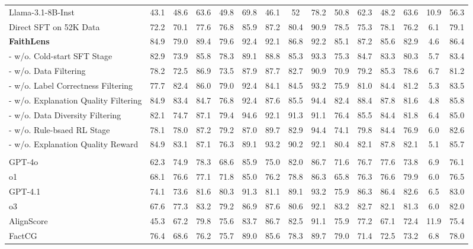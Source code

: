 \begin{table}[!t]
{\begin{tabular}{lcccccccccccccc}
Llama-3.1-8B-Inst & 43.1 & 48.6 & 63.6 & 49.8 & 69.8 & 46.1 & 52 & 78.2 & 50.8 & 62.3 & 48.2 & 63.6 & 10.9 & 56.3 \\
Direct SFT on 52K Data  & 72.2 & 70.1 & 77.6 & 76.8 & 85.9 & 87.2 & 80.4 & 90.9 & 78.5 & 75.3 & 78.1 & 76.2 & 6.1 & 79.1 \\
\rowcolor{blue!5} \textbf{FaithLens} &{84.9}&{79.0}&{89.4}&{79.6}&{92.4}&{92.1}&{86.8}&{92.2}&{85.1}&{87.2}&85.6&{82.9}&{4.6}&{86.4}   \\
- w/o. Cold-start SFT Stage &82.9 & 73.9 & 85.8 & 78.3 & 89.1 & 88.8 & 85.3 & 93.3 & 75.3 & 84.7 & 83.3 & 80.3 & 5.7 & 83.4 \\
- w/o. Data Filtering  & 78.2 & 72.5 & 86.9 & 73.5 & 87.9 & 87.7 & 82.7 & 90.9 & 70.9 & 79.2 & 85.3 & 78.6 & 6.7 & 81.2 \\
- w/o. Label Correctness Filtering & 77.7 & 82.4 & 86.0 & 79.0 & 92.4 & 84.1 & 84.5 & 93.2 & 75.9 & 81.0 & 84.4 & 81.2 & 5.3 & 83.5 \\
- w/o. Explanation Quality Filtering & 84.9 & 83.4 & 84.7 & 76.8 & 92.4 & 87.6 & 85.5 & 94.4 & 82.4 & 88.4 & 87.8 & 81.6 & 4.8 & 85.8 \\
- w/o. Data Diversity Filtering & 82.1 & 74.7 & 87.1 & 79.4 & 94.6 & 92.1 & 91.3 & 91.1 & 76.4 & 85.5 & 84.4 & 81.8 & 6.4 & 85.0 \\
- w/o. Rule-bsaed RL Stage & 78.1 & 78.0 & 87.2 & 79.2 & 87.0 & 89.7 & 82.9 & 94.4 & 74.1 & 79.8 & 84.4 & 76.9 & 6.0 & 82.6 \\
- w/o. Explanation Quality Reward & 84.9 & 83.1 & 87.1 & 76.3 & 89.1 & 93.2 & 90.2 & 92.1 & 80.4 & 82.1 & 87.8 & 82.1 & 5.1 & 85.7 \\
\midrule
\rowcolor{mypink} \multicolumn{15}{c}{\cellcolor{mypink} \textbf{Claim Decontextualization Study}} \\
GPT-4o & 62.3 & 74.9 & 78.3 & 68.6 & 85.9 & 75.0 & 82.0 & 86.7 & 71.6 & 76.7 & 77.6 & 73.8 & 6.9 & 76.1 \\
o1 & 68.1 &76.6 &77.1& 71.8 &85.0 &76.2 &78.8 &86.3 &65.8 &76.3 &76.6 &79.9 &6.0 &76.5  \\
GPT-4.1 & 74.1 &73.6 &81.6 &80.3 &91.3 &81.1 &89.1 &93.2 &75.9 &86.3 &86.4 &82.6 &6.5 &83.0 \\
o3 &  67.6& 77.3 &83.2 &79.2 &86.9 &87.6& 80.6 &92.1 &83.2 &82.7 &82.1 &81.3& 6.0 &82.0 \\
\hdashline[2pt/3pt]
AlignScore & 45.3 &67.2 &79.8 &75.6 &83.7 &86.7 &82.5 &91.1 &75.9 &77.2 &67.1 &72.4 &11.9 &75.4   \\
FactCG & 76.4 &68.6 &76.2 &75.7 &89.0 &85.6 &78.3 &89.7 &79.0 &71.4 &72.5 &73.2 &6.8 &78.0   \\

\end{tabular}}
\end{table}
